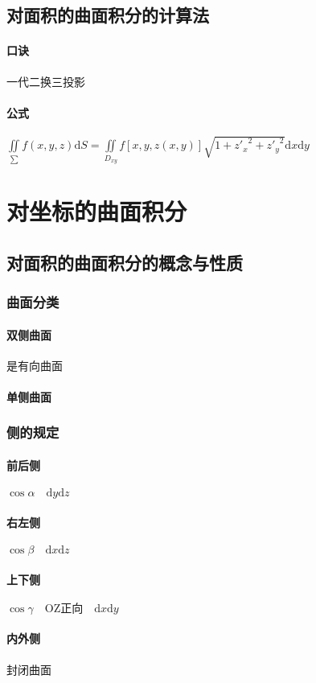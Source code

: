 \documentclass[UTF8,a4paper,12pt,scheme=chinese]{ctexbook}
\newcommand{\ud}{\mathrm{d}}
\theoremstyle{plain}
\begin{document}
	\subsection{对面积的曲面积分的计算法}
	\paragraph{口诀}一代二换三投影
	\paragraph{公式}
	$\iint\limits_{\sum } f(x,y,z)\ud S = \iint\limits_{{D_{xy}}} {f[x,y,z(x,y)]\sqrt {1 + {{z'}_x}^2 + {{z'}_y}^2} }\ud x \ud y$
	\section{对坐标的曲面积分}
	\subsection{对面积的曲面积分的概念与性质}
	\subsubsection{曲面分类}
	\paragraph{双侧曲面}是有向曲面
	\paragraph{单侧曲面}
	\subsubsection{侧的规定}
	\paragraph{前后侧}$ \cos\alpha\quad\ud y\ud z$
	\paragraph{右左侧}$ \cos\beta\quad\ud x\ud z$
	\paragraph{上下侧}$ \cos\gamma\quad\mbox{OZ正向}\quad\ud x\ud y$
	\paragraph{内外侧}封闭曲面
\end{document}
